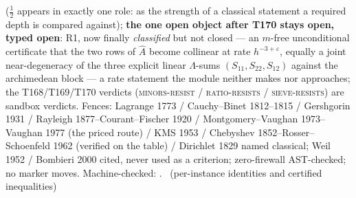 ($\tfrac12$ appears in exactly one role: as the strength of a classical
statement a required depth is compared against); \textbf{the one open
object after T170 stays open, typed open}: R1, now finally
\emph{classified} but not closed --- an $m$-free unconditional
certificate that the two rows of $\hat A$ become collinear at rate
$h^{-3+\varepsilon}$, equally a joint near-degeneracy of the three
explicit linear $\Lambda$-sums $(S_{11},S_{22},S_{12})$ against the
archimedean block --- a rate statement the module neither makes nor
approaches; the T168/T169/T170 verdicts (\textsc{minors-resist} /
\textsc{ratio-resists} / \textsc{sieve-resists}) are sandbox verdicts.
Fences: Lagrange 1773 / Cauchy--Binet 1812--1815 / Gershgorin 1931 /
Rayleigh 1877--Courant--Fischer 1920 / Montgomery--Vaughan
1973--Vaughan 1977 (the priced route) / KMS 1953 / Chebyshev
1852--Rosser--Schoenfeld 1962 (verified on the table) / Dirichlet 1829
named classical; Weil 1952 / Bombieri 2000 cited, never used as a
criterion; zero-firewall AST-checked; no marker moves.
Machine-checked: .
\mE\ (per-instance identities and certified inequalities)


